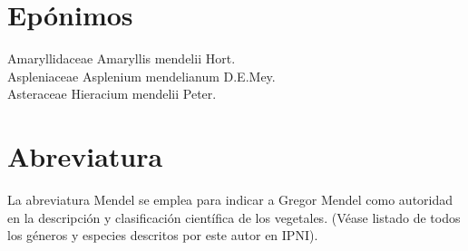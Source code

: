 \documentclass[letterpaper,12pt]{report}
\begin{document}
\chapter{Epónimos}

Amaryllidaceae Amaryllis mendelii Hort.\\
Aspleniaceae Asplenium  mendelianum D.E.Mey.\\
Asteraceae Hieracium mendelii Peter.\\

\chapter{Abreviatura}
La abreviatura Mendel se emplea para indicar a Gregor Mendel como autoridad en la descripción y clasificación científica de los vegetales. (Véase listado de todos los géneros y especies descritos por este autor en IPNI).





\end{document}
